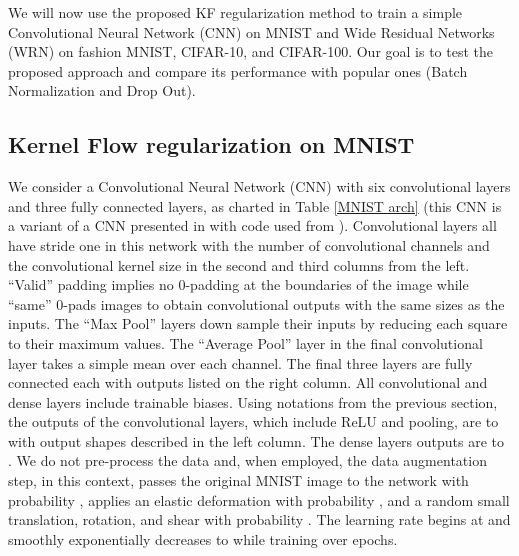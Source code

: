 \documentclass[11pt]{article}
\begin{document}
We will now use the  proposed KF regularization method to train a simple Convolutional Neural Network (CNN) on MNIST and Wide Residual Networks (WRN) \cite{WRNZagKom} on fashion MNIST, CIFAR-10, and CIFAR-100. Our goal is to test the proposed approach and compare its performance with popular ones (Batch Normalization and Drop Out).


\subsection{Kernel Flow regularization on MNIST}

We consider a Convolutional Neural Network (CNN) with six convolutional layers and three fully connected layers, as charted in Table \ref{MNIST arch} (this CNN is a variant of a CNN presented in \cite{Kagglemnist} with code used from \cite{CNNTF}).  Convolutional layers all have stride one in this network with the number of convolutional channels and the convolutional kernel size in the second and third columns from the left.  ``Valid'' padding implies no 0-padding at the boundaries of the image while ``same'' 0-pads images to obtain convolutional outputs with the same sizes as the inputs.  The ``Max Pool'' layers down sample their inputs by reducing each  square to their maximum values.  The ``Average Pool'' layer in the final convolutional layer takes a simple mean over each channel.  The final three layers are fully connected each with outputs listed on the right column.  All convolutional and dense layers include trainable biases.  Using notations from the previous section, the outputs of the convolutional layers, which include ReLU and pooling, are   to  with output shapes  described in the left column.  The dense layers outputs are   to .  We do not pre-process the data and, when employed, the data augmentation step, in this context, passes the original MNIST image to the network with probability , applies an elastic deformation \cite{elasticdef} with probability , and a random small translation, rotation, and shear with probability .  The learning rate begins at  and smoothly exponentially decreases to  while training over  epochs.
\end{document}
